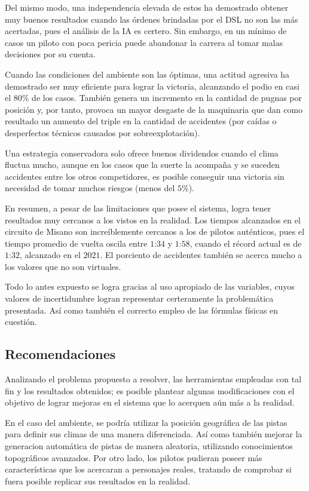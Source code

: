 \documentclass[12pt, letterpaper,spanish]{article}
\theoremstyle{definition}
\theoremstyle{remark}
\begin{document}
	Del mismo modo, una independencia elevada de estos ha demostrado obtener muy buenos resultados cuando las órdenes brindadas por el DSL no son las más acertadas, pues el análisis de la IA es certero. Sin embargo, en un mínimo de casos un piloto con poca pericia puede abandonar la carrera al tomar malas decisiones por su cuenta.

	Cuando las condiciones del ambiente son las óptimas, una actitud agresiva ha demostrado ser muy eficiente para lograr la victoria, alcanzando el podio en casi el $80\%$ de los casos. También genera un incremento en la cantidad de pugnas por posición y, por tanto, provoca un mayor desgaste de la maquinaria que dan como resultado un aumento del triple en la cantidad de accidentes (por caídas o desperfectos técnicos causados por sobreexplotación). 

	Una estrategia conservadora solo ofrece buenos dividendos cuando el clima fluctua mucho, aunque en los casos que la suerte la acompaña y se suceden accidentes entre los otros competidores, es posible conseguir una victoria sin necesidad de tomar muchos riesgos (menos del $5\%$).

	En resumen, a pesar de las limitaciones que posee el sistema, logra tener resultados muy cercanos a los vistos en la realidad. Los tiempos alcanzados en el circuito de Misano son increíblemente cercanos a los de pilotos auténticos, pues el tiempo promedio de vuelta oscila entre $1$:$34$ y $1$:$58$, cuando el récord actual es de $1$:$32$, alcanzado en el $2021$. El porciento de accidentes también se acerca mucho a los valores que no son virtuales. 

	Todo lo antes expuesto se logra gracias al uso apropiado de las variables, cuyos valores de incertidumbre logran representar certeramente la problemática presentada. Así como también el correcto empleo de las fórmulas físicas en cuestión. 

	\subsection{Recomendaciones}
	Analizando el problema propuesto a resolver, las herramientas empleadas con tal fin y los resultados obtenidos; es posible plantear algunas modificaciones con el objetivo de lograr mejoras en el sistema que lo acerquen aún más a la realidad.

	En el caso del ambiente, se podría utilizar la posición geográfica de las pistas para definir sus climas de una manera diferenciada. Así como también mejorar la generacion automática de pistas de manera aleatoria, utilizando conocimientos topográficos avanzados. Por otro lado, los pilotos pudieran poseer más características que los acercaran a personajes reales, tratando de comprobar si fuera posible replicar sus resultados en la realidad.
\end{document}

